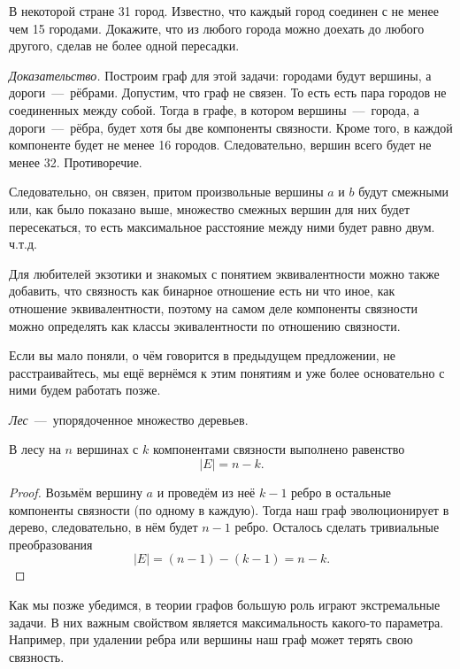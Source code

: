 \begin{example}
	В некоторой стране 31 город. Известно, что каждый город соединен с не менее чем 15 городами. Докажите, 
	что из любого города можно доехать до любого другого, сделав не более одной пересадки.
	
	\emph{Доказательство.} Построим граф для этой задачи: городами будут вершины, а дороги~---~рёбрами. Допустим, что граф не связен. 
	То есть есть пара городов не соединенных между собой. Тогда в графе, в котором вершины~---~города, а дороги~---~рёбра, будет хотя бы 
	две компоненты связности. Кроме того, в каждой компоненте будет не менее 16 городов. Следовательно, вершин всего будет не менее 32. Противоречие. 
	
	Следовательно, он связен, притом произвольные вершины $a$ и $b$ будут смежными или, как было показано выше, множество 
	смежных вершин для них будет пересекаться, то есть максимальное расстояние между ними будет равно двум. ч.т.д.
\end{example}

	Для любителей экзотики и знакомых с понятием эквивалентности можно также добавить, что связность как бинарное отношение есть 
	ни что иное, как отношение эквивалентности, поэтому на самом деле компоненты связности можно определять как классы 
	экивалентности по отношению связности.
	
	Если вы мало поняли, о чём говорится в предыдущем предложении, не расстраивайтесь, мы ещё вернёмся к этим понятиям и уже более 
	основательно с ними будем работать позже. 

\begin{definition}
	\emph{Лес}~---~упорядоченное множество деревьев.
\end{definition}

\begin{statement}
	В лесу на $n$ вершинах с $k$ компонентами связности выполнено равенство
	$$|E| = n - k.$$
	
\begin{proof}
	Возьмём вершину $a$ и проведём из неё $k-1$ ребро в остальные компоненты связности (по одному в каждую). Тогда наш граф 
	эволюционирует в дерево, следовательно, в нём будет $n-1$ ребро. Осталось сделать тривиальные преобразования
	$$|E| = (n-1) - (k-1) = n-k.$$
\end{proof}
\end{statement}



	Как мы позже убедимся, в теории графов большую роль играют экстремальные задачи. В них важным свойством является 
	максимальность какого-то параметра. Например, при удалении ребра или вершины наш граф может терять свою связность.

